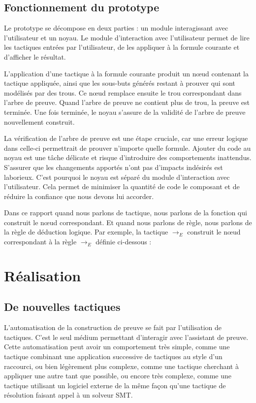 \documentclass[french,titlepage]{article}
\begin{document}
\subsection{Fonctionnement du prototype} \label{env_travail:fonctionnement_proto}
Le prototype se décompose en deux parties : un module interagissant avec l'utilisateur et un noyau. Le module d'interaction avec l'utilisateur permet de lire les tactiques entrées par l'utilisateur, de les appliquer à la formule courante et d'afficher le résultat.

L'application d'une tactique à la formule courante produit
un nœud contenant la tactique appliquée, ainsi que les sous-buts générés restant à prouver qui sont modélisés par des trous. Ce nœud remplace ensuite le trou correspondant dans l'arbre de preuve. Quand l'arbre de preuve ne contient plus de trou, la preuve est terminée. Une fois terminée, le noyau s'assure de la validité de l'arbre de preuve nouvellement construit.

La vérification de l'arbre de preuve est une étape cruciale, car une erreur logique dans celle-ci permettrait de prouver n'importe quelle formule. Ajouter du code au noyau est une tâche délicate et risque d'introduire des comportements inattendus. S'assurer que les changements apportés n'ont pas d'impacts indésirés est laborieux. C'est pourquoi le noyau est séparé du module d'interaction avec l'utilisateur. Cela permet de minimiser la quantité de code le composant et de réduire la confiance que nous devons lui accorder.

Dans ce rapport quand nous parlons de tactique, nous parlons de la fonction qui construit le nœud correspondant. Et quand nous parlons de règle, nous parlons de la règle de déduction logique. Par exemple, la tactique $\to_E$ construit le nœud correspondant à la règle $\to_E$ définie ci-dessous :
\begin{mathpar}
\end{mathpar}



\section{Réalisation} \label{realisation}
\subsection{De nouvelles tactiques} \label{realisation:nouvelles_tactiques}
L'automatisation de la construction de preuve se fait par l'utilisation de tactiques. C'est le seul médium permettant d'interagir avec l'assistant de preuve. Cette automatisation peut avoir un comportement très simple, comme une tactique combinant une application successive de tactiques au style d'un raccourci, ou bien légèrement plus complexe, comme une tactique cherchant à appliquer une autre tant que possible, ou encore très complexe, comme une tactique utilisant un logiciel externe de la même façon qu'une tactique de résolution faisant appel à un solveur SMT.
\end{document}
